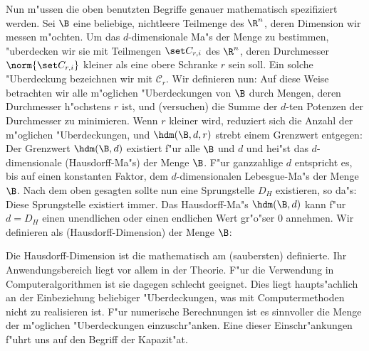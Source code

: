 Nun m"ussen die oben benutzten Begriffe genauer mathematisch spezifiziert werden. 
Sei $\B$ eine beliebige, nichtleere Teilmenge des $\R^n$, deren Dimension wir messen m"ochten. Um das
$d$-dimensionale Ma"s  der Menge zu bestimmen, "uberdecken wir sie mit Teilmengen 
$\set C_{r,i}$ des $\R^n$, deren Durchmesser $\norm{\set C_{r,i}}$ kleiner als eine obere
Schranke $r$ sein soll. Ein solche "Uberdeckung bezeichnen wir mit $\mathcal
C_r$. Wir definieren nun:
Auf diese Weise betrachten wir alle m"oglichen "Uberdeckungen von $\B$ durch Mengen,
deren Durchmesser h"ochstens $r$ ist, und \naja(versuchen) die Summe der $d$-ten Potenzen der
Durchmesser zu minimieren. Wenn $r$ kleiner wird, reduziert sich die Anzahl der
m"oglichen "Uberdeckungen, und $\hdm(\B,d,r)$ strebt einem Grenzwert entgegen:
Der Grenzwert $\hdm(\B,d)$ existiert f"ur alle $\B$ und $d$ und hei"st das
$d$-dimensionale \begriff(Hausdorff-Ma"s) der Menge $\B$. F"ur ganzzahlige $d$ entspricht
es, bis auf einen konstanten Faktor, dem $d$-dimensionalen Lebesgue-Ma"s der Menge
$\B$. Nach dem oben gesagten sollte nun eine Sprungstelle $D_H$ existieren, so
da"s:
Diese Sprungstelle existiert immer\footnotemark. 
Das Hausdorff-Ma"s $\hdm(\B,d)$ kann f"ur
$d=D_H$ einen unendlichen oder einen endlichen Wert gr"o"ser 0 annehmen\footnotemark. Wir definieren als
\begriff(Hausdorff-Dimension) der Menge $\B$:

Die Hausdorff-Dimension ist die mathematisch am \naja(saubersten) definierte. Ihr
Anwendungsbereich liegt vor allem in der Theorie. F"ur die Verwendung in
Computeralgorithmen ist sie dagegen schlecht geeignet. Dies liegt haupts"achlich an
der Einbeziehung beliebiger "Uberdeckungen, was mit Computermethoden nicht zu realisieren
ist. F"ur numerische Berechnungen ist es sinnvoller die Menge der m"oglichen
"Uberdeckungen einzuschr"anken. Eine dieser Einschr"ankungen f"uhrt uns auf den Begriff
der Kapazit"at.



